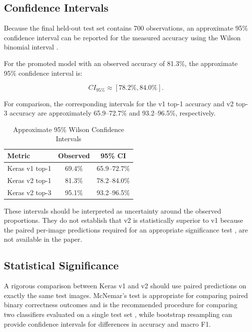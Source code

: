 \documentclass[conference]{IEEEtran}
\begin{document}
\subsection{Confidence Intervals}

Because the final held-out test set contains 700 observations, an approximate 95\% confidence interval can be reported for the measured accuracy using the Wilson binomial interval \cite{b17}.

For the promoted model with an observed accuracy of 81.3\%, the approximate 95\% confidence interval is:

\begin{equation}
CI_{95\%}\approx[78.2\%,84.0\%].
\end{equation}

For comparison, the corresponding intervals for the v1 top-1 accuracy and v2 top-3 accuracy are approximately 65.9--72.7\% and 93.2--96.5\%, respectively.

\begin{table}[!t]
\caption{Approximate 95\% Wilson Confidence Intervals \cite{b17}}
\centering
\scriptsize
\begin{tabular}{l c c}
\toprule
\textbf{Metric} & \textbf{Observed} & \textbf{95\% CI}\\
\midrule
Keras v1 top-1 & 69.4\% & 65.9--72.7\%\\
Keras v2 top-1 & 81.3\% & 78.2--84.0\%\\
Keras v2 top-3 & 95.1\% & 93.2--96.5\%\\
\bottomrule
\end{tabular}
\label{tab:confidence_intervals}
\end{table}

These intervals should be interpreted as uncertainty around the observed proportions. They do not establish that v2 is statistically superior to v1 because the paired per-image predictions required for an appropriate significance test \cite{b16}, \cite{b18} are not available in the paper.

\subsection{Statistical Significance}

A rigorous comparison between Keras v1 and v2 should use paired predictions on exactly the same test images. McNemar's test \cite{b16} is appropriate for comparing paired binary correctness outcomes and is the recommended procedure for comparing two classifiers evaluated on a single test set \cite{b18}, while bootstrap resampling \cite{b19} can provide confidence intervals for differences in accuracy and macro F1.
\end{document}
